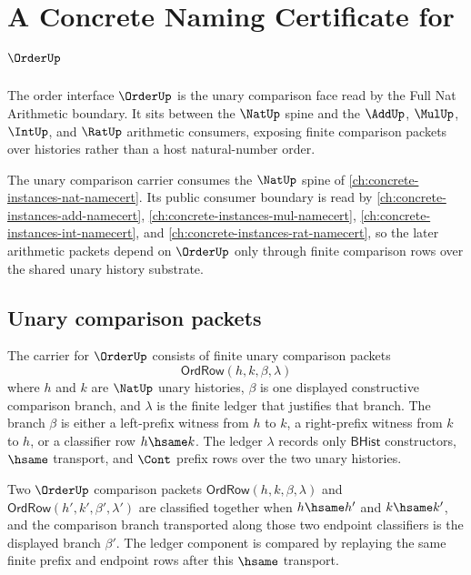 \chapter{A Concrete Naming Certificate for $\OrderUp$}
\label{ch:concrete-instances-order-namecert}

The order interface $\OrderUp$ is the unary comparison face read by the Full Nat Arithmetic boundary. It sits between the $\NatUp$ spine and the $\AddUp$, $\MulUp$, $\IntUp$, and $\RatUp$ arithmetic consumers, exposing finite comparison packets over histories rather than a host natural-number order.

The unary comparison carrier consumes the $\NatUp$ spine of \autoref{ch:concrete-instances-nat-namecert}. Its public consumer boundary is read by \autoref{ch:concrete-instances-add-namecert}, \autoref{ch:concrete-instances-mul-namecert}, \autoref{ch:concrete-instances-int-namecert}, and \autoref{ch:concrete-instances-rat-namecert}, so the later arithmetic packets depend on $\OrderUp$ only through finite comparison rows over the shared unary history substrate.

\section{Unary comparison packets}

\begin{definition}
\label{def:order-unary-comparison-carrier}
The carrier for $\OrderUp$ consists of finite unary comparison packets
$$
\mathsf{OrdRow}(h,k,\beta,\lambda)
$$
where $h$ and $k$ are $\NatUp$ unary histories, $\beta$ is one displayed constructive comparison branch, and $\lambda$ is the finite ledger that justifies that branch. The branch $\beta$ is either a left-prefix witness from $h$ to $k$, a right-prefix witness from $k$ to $h$, or a classifier row $h\hsame k$. The ledger $\lambda$ records only $\mathsf{BHist}$ constructors, $\hsame$ transport, and $\Cont$ prefix rows over the two unary histories.
\end{definition}

\begin{definition}
\label{def:order-unary-comparison-classifier}
Two $\OrderUp$ comparison packets $\mathsf{OrdRow}(h,k,\beta,\lambda)$ and $\mathsf{OrdRow}(h',k',\beta',\lambda')$ are classified together when $h\hsame h'$ and $k\hsame k'$, and the comparison branch transported along those two endpoint classifiers is the displayed branch $\beta'$. The ledger component is compared by replaying the same finite prefix and endpoint rows after this $\hsame$ transport.
\end{definition}

